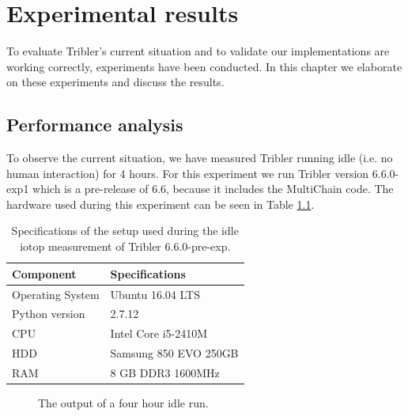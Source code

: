 \chapter{Experimental results}
\label{cpt:experiments}

To evaluate Tribler's current situation and to validate our implementations are working correctly, experiments have been conducted.
In this chapter we elaborate on these experiments and discuss the results. 

\section{Performance analysis}
To observe the current situation, we have measured Tribler running idle (i.e. no human interaction) for 4 hours.
For this experiment we run Tribler version 6.6.0-exp1 which is a pre-release of 6.6, because it includes the MultiChain code.
The hardware used during this experiment can be seen in Table \ref{table:tribler_idle}.

\begin{table}[h]
	\centering
	\begin{tabular}{l|l}
		\textbf{Component} 	& \textbf{Specifications} \\ \hline
		Operating System   	& Ubuntu 16.04 LTS \\
		Python version		& 2.7.12 \\
		CPU					& Intel Core i5-2410M \\ 
		HDD					& Samsung 850 EVO 250GB  \\ 
		RAM					& 8 GB DDR3 1600MHz \\
	\end{tabular}
	\caption{Specifications of the setup used during the idle iotop measurement of Tribler 6.6.0-pre-exp.}
	\label{table:tribler_idle}
\end{table}

\begin{figure}[h]
	\caption{The output of a four hour idle run.}
	\label{fig:htop_io_idle_run}
\end{figure} 

